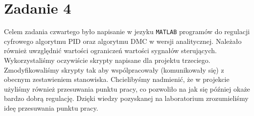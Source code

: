 \chapter{Zadanie 4}
Celem zadania czwartego było napisanie w jezyku \texttt{MATLAB} programów do regulacji cyfrowego algorytmu PID oraz algorytmu DMC w wersji analitycznej. Należało również uwzględnić wartości ograniczeń wartości
sygnałów sterujących. Wykorzystaliśmy oczywiście skrypty napisane dla projektu trzeciego. Zmodyfikowaliśmy skrypty tak aby wspólpracowały (komunikowały się) z obecnym zestawieniem stanowiska. Chcielibyśmy nadmienić,
że w projekcie użyliśmy również przesuwania punktu pracy, co pozwoliło na jak się później okaże bardzo dobrą regulację. Dzięki wiedzy pozyskanej na laboratorium zrozumieliśmy ideę przesuwania punktu
pracy. %
